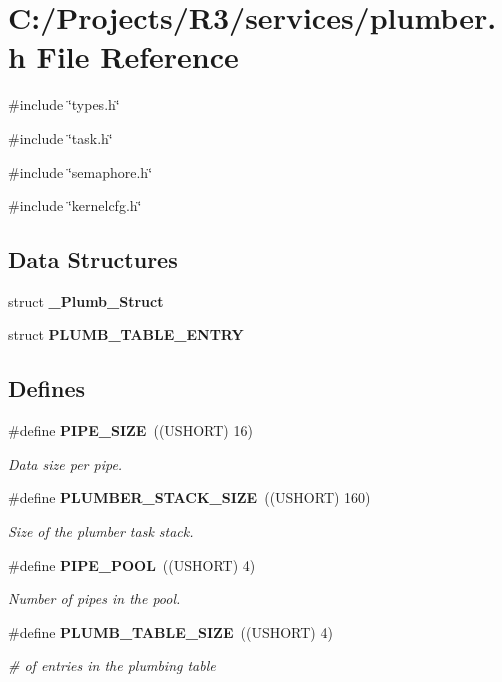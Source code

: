 \section{C:/Projects/R3/services/plumber.h File Reference}
\label{plumber_8h}
{\ttfamily \#include \char`\"{}types.h\char`\"{}}\par
{\ttfamily \#include \char`\"{}task.h\char`\"{}}\par
{\ttfamily \#include \char`\"{}semaphore.h\char`\"{}}\par
{\ttfamily \#include \char`\"{}kernelcfg.h\char`\"{}}\par
\subsection*{Data Structures}
\begin{DoxyCompactItemize}
\item 
struct {\bf \_\-Plumb\_\-Struct}
\item 
struct {\bf PLUMB\_\-TABLE\_\-ENTRY}
\end{DoxyCompactItemize}
\subsection*{Defines}
\begin{DoxyCompactItemize}
\item 
\#define {\bf PIPE\_\-SIZE}~((USHORT) 16)
\begin{DoxyCompactList}\small\item\em Data size per pipe. \item\end{DoxyCompactList}\item 
\#define {\bf PLUMBER\_\-STACK\_\-SIZE}~((USHORT) 160)
\begin{DoxyCompactList}\small\item\em Size of the plumber task stack. \item\end{DoxyCompactList}\item 
\#define {\bf PIPE\_\-POOL}~((USHORT) 4)
\begin{DoxyCompactList}\small\item\em Number of pipes in the pool. \item\end{DoxyCompactList}\item 
\#define {\bf PLUMB\_\-TABLE\_\-SIZE}~((USHORT) 4)
\begin{DoxyCompactList}\small\item\em \# of entries in the plumbing table \item\end{DoxyCompactList}\end{DoxyCompactItemize}
